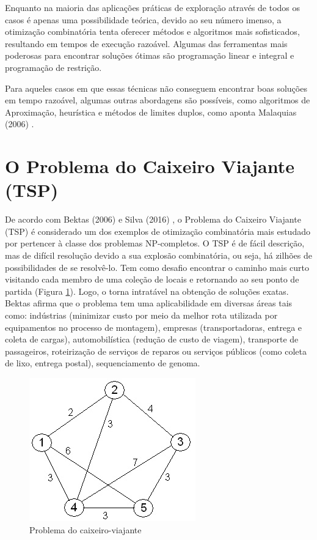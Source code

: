 Enquanto na maioria das aplicações práticas de exploração através de todos os casos é apenas uma possibilidade teórica, devido ao seu número imenso, a otimização combinatória tenta oferecer métodos e algoritmos mais sofisticados, resultando em tempos de execução razoável. Algumas das ferramentas mais poderosas para encontrar soluções ótimas são programação linear e integral e programação de restrição.

Para aqueles casos em que essas técnicas não conseguem encontrar boas soluções em tempo razoável, algumas outras abordagens são possíveis, como algoritmos de Aproximação, heurística e métodos de limites duplos, como aponta Malaquias (2006) \cite{malaquias2006uso}.

\section{O Problema do Caixeiro Viajante (TSP)}
\label{sec-tsp}

De acordo com Bektas (2006) \cite{bektas2006multiple} e Silva (2016) \cite{silva2016algoritmo}, o Problema do Caixeiro Viajante (TSP) é considerado um dos exemplos de otimização combinatória mais estudado por pertencer à classe dos problemas NP-completos. O TSP é de fácil descrição, mas de difícil resolução devido a sua explosão combinatória, ou seja, há zilhões de possibilidades de se resolvê-lo. Tem como desafio encontrar o caminho mais curto visitando cada membro de uma coleção de locais e retornando ao seu ponto de partida (Figura \ref{fig:tsp-sample}). Logo, o torna intratável na obtenção de soluções exatas. Bektas afirma que o problema tem uma aplicabilidade em diversas áreas tais como: indústrias (minimizar custo por meio da melhor rota utilizada por equipamentos no processo de montagem), empresas (transportadoras, entrega e coleta de cargas), automobilística (redução de custo de viagem), transporte de passageiros, roteirização de serviços de reparos ou serviços públicos (como coleta de lixo, entrega postal), sequenciamento de genoma.

\begin{figure}[h]
	\caption{\label{fig:tsp-sample}Problema do caixeiro-viajante}
	\begin{center}
	    \includegraphics[scale=0.5]{imagens/tsp-sample.jpg}
	\end{center}
\end{figure}


